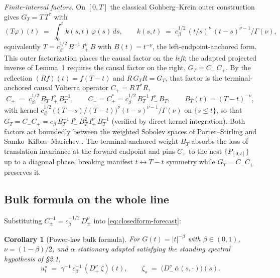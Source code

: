 \documentclass[11pt]{article}
\theoremstyle{plain}
\newtheorem{corollary}{Corollary}
\begin{document}
\emph{Finite-interval factors.} On $[0,T]$ the classical Gohberg--Krein outer construction \citep{FordeSanchezSmith2022,PorterStirling1990} gives $G_T = T\,T^*$ with
\begin{equation}\label{eq:volterra-kernel}
(T\varphi)(t) \;=\; \int_0^t k(s,t)\,\varphi(s)\,ds, \qquad k(s,t) \;=\; c_\beta^{1/2}\,(t/s)^{\nu}\,(t-s)^{\nu-1}/\Gamma(\nu),
\end{equation}
equivalently $T = c_\beta^{1/2}\, B^{-1}\, I_+^\nu\, B$ with $B(t)=t^{-\nu}$, the left-endpoint-anchored form. This outer factorization places the causal factor on the \emph{left}; the adapted projected inverse of Lemma~1 requires the causal factor on the right, $G_T = C_-\,C_+$. By the reflection $(Rf)(t)=f(T-t)$ and $R\,G_T R = G_T$, that factor is the terminal-anchored causal Volterra operator $C_+ = R\,T^*R$,
\begin{equation}\label{eq:weight-conj}
C_+ \;=\; c_\beta^{1/2}\, B_T\, I_+^\nu\, B_T^{-1}, \qquad C_- = C_+^* = c_\beta^{1/2}\, B_T^{-1}\, I_-^\nu\, B_T, \qquad B_T(t) = (T-t)^{-\nu},
\end{equation}
with kernel $c_\beta^{1/2}\,\bigl((T-s)/(T-t)\bigr)^{\nu}(t-s)^{\nu-1}/\Gamma(\nu)$ on $\{s\le t\}$, so that $G_T = C_-C_+ = c_\beta\, B_T^{-1}\, I_-^\nu\, B_T^2\, I_+^\nu\, B_T^{-1}$ (verified by direct kernel integration). Both factors act boundedly between the weighted Sobolev spaces of Porter--Stirling \citep[Ex.~6.2/9.2]{PorterStirling1990} and Samko--Kilbas--Marichev \citep[\S13.5]{SamkoKilbasMarichev1993}. The terminal-anchored weight $B_T$ absorbs the loss of translation invariance at the forward endpoint and pins $C_+$ to the nest $\{P_{[0,t]}\}$ up to a diagonal phase, breaking manifest $t\leftrightarrow T{-}t$ symmetry while $G_T = C_-C_+$ preserves it.

\subsection{Bulk formula on the whole line}

Substituting $C_\pm^{-1} = c_\beta^{-1/2}\,D_\pm^\nu$ into \eqref{eq:closedform-forecast}:

\begin{corollary}[Power-law bulk formula]
For $G(t) = |t|^{-\beta}$ with $\beta\in(0,1)$, $\nu = (1-\beta)/2$, and $\alpha$ stationary adapted satisfying the standing spectral hypothesis of \S2.1,
\begin{equation}\label{eq:bulk}
u^\star_t \;=\; \gamma^{-1}\,c_\beta^{-1}\,(D_+^\nu\,\zeta)(t), \qquad \zeta_s \;=\; \bigl(D_-^\nu\,\bar\alpha(s,\cdot)\bigr)(s).
\end{equation}
\end{corollary}
\end{document}
